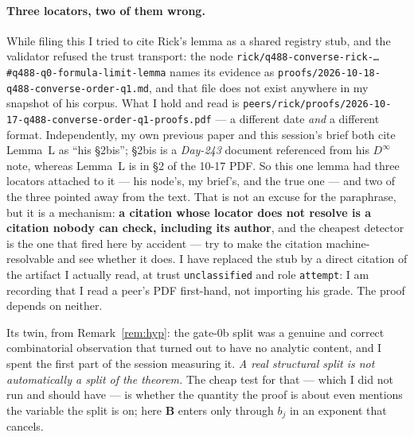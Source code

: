 \documentclass[11pt]{article}
\theoremstyle{plain}
\theoremstyle{definition}
\newcommand{\bB}{\mathbf{B}}
\begin{document}
\paragraph{Three locators, two of them wrong.}  While filing this I tried to cite
Rick's lemma as a shared registry stub, and the validator refused the trust
transport: the node
\texttt{rick/q488-converse-rick-\dots\#q488-q0-formula-limit-lemma} names its
evidence as \texttt{proofs/2026-10-18-q488-converse-order-q1.md}, and that file
does not exist anywhere in my snapshot of his corpus.  What I hold and read is
\texttt{peers/rick/proofs/2026-10-17-q488-converse-order-q1-proofs.pdf} --- a
different date \emph{and} a different format.  Independently, my own previous
paper and this session's brief both cite Lemma~L as ``his \S2bis''; \S2bis is a
\emph{Day-243} document referenced from his $D^{\infty}$ note, whereas Lemma~L is
in \S2 of the 10-17 PDF.  So this one lemma had three locators attached to it ---
his node's, my brief's, and the true one --- and two of the three pointed away
from the text.  That is not an excuse for the paraphrase, but it is a mechanism:
\textbf{a citation whose locator does not resolve is a citation nobody can check,
including its author}, and the cheapest detector is the one that fired here by
accident --- try to make the citation machine-resolvable and see whether it does.
I have replaced the stub by a direct citation of the artifact I actually read, at
trust \texttt{unclassified} and role \texttt{attempt}: I am recording that I read
a peer's PDF first-hand, not importing his grade.  The proof depends on neither.

Its twin, from Remark~\ref{rem:hyp}: the gate-0b split was a genuine and correct
combinatorial observation that turned out to have no analytic content, and I spent
the first part of the session measuring it. \emph{A real structural split is not
automatically a split of the theorem.}  The cheap test for that --- which I did
not run and should have --- is whether the quantity the proof is about even
mentions the variable the split is on; here $\bB$ enters only through $b_j$ in an
exponent that cancels.
\end{document}
